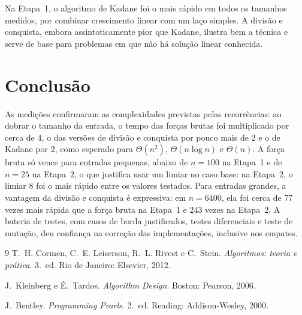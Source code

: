 \documentclass[11pt,a4paper]{article}
\begin{document}
Na Etapa~1, o algoritmo de Kadane foi o mais rápido em todos os tamanhos medidos, por combinar crescimento linear com um laço simples. A divisão e conquista, embora assintoticamente pior que Kadane, ilustra bem a técnica e serve de base para problemas em que não há solução linear conhecida.

\section{Conclusão}

As medições confirmaram as complexidades previstas pelas recorrências: ao dobrar o tamanho da entrada, o tempo das forças brutas foi multiplicado por cerca de 4, o das versões de divisão e conquista por pouco mais de 2 e o de Kadane por 2, como esperado para $\Theta(n^2)$, $\Theta(n\log n)$ e $\Theta(n)$. A força bruta só vence para entradas pequenas, abaixo de $n = 100$ na Etapa~1 e de $n = 25$ na Etapa~2, o que justifica usar um limiar no caso base: na Etapa~2, o limiar 8 foi o mais rápido entre os valores testados. Para entradas grandes, a vantagem da divisão e conquista é expressiva: em $n = 6400$, ela foi cerca de 77 vezes mais rápida que a força bruta na Etapa~1 e 243 vezes na Etapa~2. A bateria de testes, com casos de borda justificados, testes diferenciais e teste de mutação, deu confiança na correção das implementações, inclusive nos empates.

\begin{thebibliography}{9}
T.~H. Cormen, C.~E. Leiserson, R.~L. Rivest e C.~Stein.
\emph{Algoritmos: teoria e prática}. 3.~ed. Rio de Janeiro: Elsevier, 2012.

J.~Kleinberg e É.~Tardos.
\emph{Algorithm Design}. Boston: Pearson, 2006.

J.~Bentley.
\emph{Programming Pearls}. 2.~ed. Reading: Addison-Wesley, 2000.
\end{thebibliography}
\end{document}
